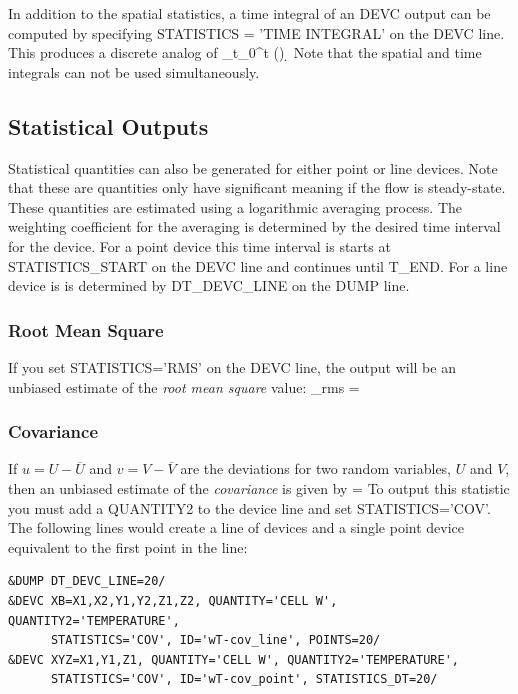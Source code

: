 \documentclass[11pt]{book}
\begin{document}
In addition to the spatial statistics, a time integral of an {\ct DEVC} output can be computed by specifying
{\ct STATISTICS = 'TIME INTEGRAL'} on the {\ct DEVC} line. This produces a discrete analog of
\be
 \int_{t_0}^t \phi(\tau) \; \d \tau
\ee
Note that the spatial and time integrals can not be used simultaneously.

\subsection{Statistical Outputs}
\label{info:rmscovcorr}

Statistical quantities can also be generated for either point or line devices.  Note that these are quantities only have significant meaning if the flow is steady-state.  These quantities are estimated using a logarithmic averaging process.  The weighting coefficient for the averaging is determined by the desired time interval for the device.  For a point device this time interval is starts at {\ct STATISTICS\_START} on the {\ct DEVC} line and continues until {\ct T\_END}.  For a line device is is determined by {\ct DT\_DEVC\_LINE} on the {\ct DUMP} line.

\subsubsection{Root Mean Square}
\label{info:rms}

If you set {\ct STATISTICS='RMS'} on the {\ct DEVC} line, the output will be an unbiased estimate of the {\em root mean square} value:
\be
   \phi_{\rm rms} = 
\ee

\subsubsection{Covariance}
\label{info:covariance}

If $u = U - \overline{U}$ and $v= V-\overline{V}$ are the deviations for two random variables, $U$ and $V$, then an unbiased estimate of the \emph{covariance} is given by
\be
    = 
\ee
To output this statistic you must add a {\ct QUANTITY2} to the device line and set {\ct STATISTICS='COV'}.  The following lines would create a line of devices and a single point device equivalent to the first point in the line:
\begin{lstlisting}
&DUMP DT_DEVC_LINE=20/
&DEVC XB=X1,X2,Y1,Y2,Z1,Z2, QUANTITY='CELL W', QUANTITY2='TEMPERATURE',
      STATISTICS='COV', ID='wT-cov_line', POINTS=20/
&DEVC XYZ=X1,Y1,Z1, QUANTITY='CELL W', QUANTITY2='TEMPERATURE',
      STATISTICS='COV', ID='wT-cov_point', STATISTICS_DT=20/
\end{lstlisting}
\end{document}
